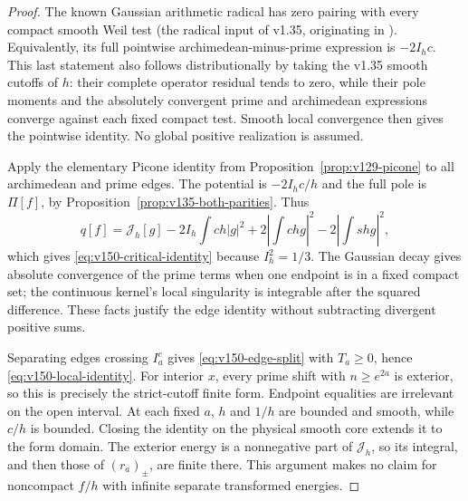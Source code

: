 \begin{proof}
The known Gaussian arithmetic radical has zero pairing with every
compact smooth Weil test (the radical input of v1.35, originating in
\cite[Section~3]{ConnesConsani2023}). Equivalently, its full pointwise
archimedean-minus-prime expression is $-2I_hc$. This last statement
also follows distributionally by taking the v1.35 smooth cutoffs of
$h$: their complete operator residual tends to zero, while their pole
moments and the absolutely convergent prime and archimedean expressions
converge against each fixed compact test. Smooth local convergence then
gives the pointwise identity. No global positive realization is assumed.

Apply the elementary Picone identity from
Proposition~\ref{prop:v129-picone} to all archimedean and prime edges.
The potential is $-2I_hc/h$ and the full pole is $\Pi[f]$, by
Proposition~\ref{prop:v135-both-parities}. Thus
\[
 q[f]=\mathcal J_h[g]-2I_h\int ch|g|^2
               +2\left|\int chg\right|^2-2\left|\int shg\right|^2,
\]
which gives \eqref{eq:v150-critical-identity} because $I_h^2=1/3$.
The Gaussian decay gives absolute convergence of the prime terms when
one endpoint is in a fixed compact set; the continuous kernel's local
singularity is integrable after the squared difference. These facts
justify the edge identity without subtracting divergent positive sums.

Separating edges crossing $I_a^c$ gives \eqref{eq:v150-edge-split}
with $T_a\ge0$, hence \eqref{eq:v150-local-identity}.
For interior $x$, every prime shift with $n\ge e^{2a}$ is exterior,
so this is precisely the strict-cutoff finite form. Endpoint equalities
are irrelevant on the open interval. At each fixed $a$, $h$ and $1/h$
are bounded and smooth, while $c/h$ is bounded. Closing the identity on
the physical smooth core extends it to the form domain. The exterior
energy is a nonnegative part of $\mathcal J_h$, so its integral, and
then those of $(r_a)_\pm$, are finite there. This argument makes no
claim for noncompact $f/h$ with infinite separate transformed energies.
\end{proof}

